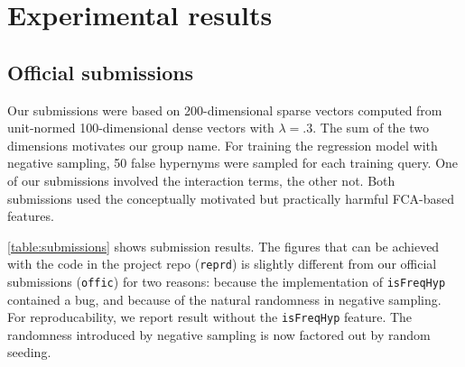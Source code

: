 \documentclass[11pt,a4paper]{article}
\begin{document}

\section{Experimental results} \label{sec:experiments}

\subsection{Official submissions}

Our submissions were based on 200-dimensional sparse vectors computed from
unit-normed 100-dimensional dense vectors with $\lambda=.3$. The sum of the two dimensions motivates our
group name. For training the regression model with negative sampling, 50 false
hypernyms were sampled for each training query. One of our submissions involved
the interaction terms, the other not. Both submissions used the conceptually
motivated but practically harmful FCA-based features. 

\autoref{table:submissions} shows submission results.
The figures that can be achieved with the code in the project repo
(\texttt{reprd}) is slightly different from our official submissions
(\texttt{offic}) for two reasons: 
because the implementation of \texttt{isFreqHyp} contained a bug, and because
of the natural randomness in negative sampling.  
For reproducability, we report result without the \texttt{isFreqHyp} feature.
The randomness introduced by negative sampling is now factored out by random
seeding. 
\end{document}
